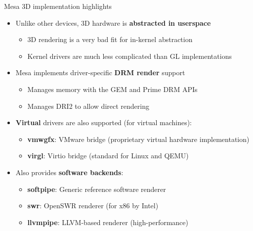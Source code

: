 \begin{frame}{Mesa 3D implementation highlights}
  \begin{itemize}
  \item Unlike other devices, 3D hardware is \textbf{abstracted in userspace}
    \begin{itemize}
    \item 3D rendering is a very bad fit for in-kernel abstraction
    \item Kernel drivers are much less complicated than GL implementations
    \end{itemize}
  \item Mesa implements driver-specific \textbf{DRM render} support\\
    \begin{itemize}
    \item Manages memory with the GEM and Prime DRM APIs
    \item Manages DRI2 to allow direct rendering
    \end{itemize}
  \item \textbf{Virtual} drivers are also supported (for virtual machines):
    \begin{itemize}
    \item \textbf{vmwgfx}: VMware bridge (proprietary virtual hardware implementation)
    \item \textbf{virgl}: Virtio bridge (standard for Linux and QEMU)
    \end{itemize}
  \item Also provides \textbf{software backends}:
    \begin{itemize}
    \item \textbf{softpipe}: Generic reference software renderer
    \item \textbf{swr}: OpenSWR renderer (for x86 by Intel)
    \item \textbf{llvmpipe}: LLVM-based renderer (high-performance)
    \end{itemize}
  \end{itemize}
\end{frame}

